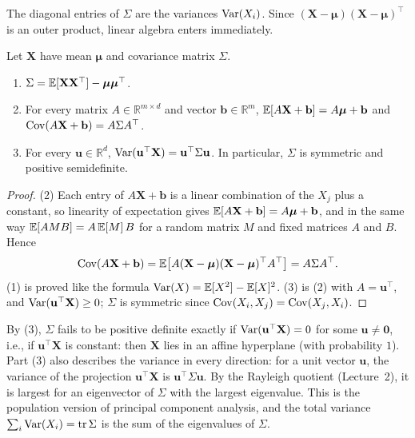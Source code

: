 The diagonal entries of $\Sigma$ are the variances $\operatorname{Var}(X_i)$. Since $(\mathbf{X} - \boldsymbol{\mu})(\mathbf{X} - \boldsymbol{\mu})^\top$ is an outer product, linear algebra enters immediately.

\begin{proposition}\label{L4-prop:covariance-matrix}
    Let $\mathbf{X}$ have mean $\boldsymbol{\mu}$ and covariance matrix $\Sigma$.
    \begin{enumerate}
        \item $\Sigma = \mathbb{E}[\mathbf{X}\mathbf{X}^\top] - \boldsymbol{\mu}\boldsymbol{\mu}^\top$.
        \item For every matrix $A \in \mathbb{R}^{m \times d}$ and vector $\mathbf{b} \in \mathbb{R}^m$, $\mathbb{E}[A\mathbf{X} + \mathbf{b}] = A\boldsymbol{\mu} + \mathbf{b}$ and $\operatorname{Cov}(A\mathbf{X} + \mathbf{b}) = A\Sigma A^\top$.
        \item For every $\mathbf{u} \in \mathbb{R}^d$, $\operatorname{Var}(\mathbf{u}^\top\mathbf{X}) = \mathbf{u}^\top\Sigma\mathbf{u}$. In particular, $\Sigma$ is symmetric and positive semidefinite.
    \end{enumerate}
\end{proposition}

\begin{proof}
    (2) Each entry of $A\mathbf{X} + \mathbf{b}$ is a linear combination of the $X_j$ plus a constant, so linearity of expectation gives $\mathbb{E}[A\mathbf{X} + \mathbf{b}] = A\boldsymbol{\mu} + \mathbf{b}$, and in the same way $\mathbb{E}[A M B] = A\,\mathbb{E}[M]\,B$ for a random matrix $M$ and fixed matrices $A$ and $B$. Hence
    \[\operatorname{Cov}(A\mathbf{X} + \mathbf{b}) = \mathbb{E}\big[A(\mathbf{X} - \boldsymbol{\mu})(\mathbf{X} - \boldsymbol{\mu})^\top A^\top\big] = A\Sigma A^\top.\]
    (1) is proved like the formula $\operatorname{Var}(X) = \mathbb{E}[X^2] - \mathbb{E}[X]^2$. (3) is (2) with $A = \mathbf{u}^\top$, and $\operatorname{Var}(\mathbf{u}^\top\mathbf{X}) \geq 0$; $\Sigma$ is symmetric since $\operatorname{Cov}(X_i, X_j) = \operatorname{Cov}(X_j, X_i)$.
\end{proof}

By (3), $\Sigma$ fails to be positive definite exactly if $\operatorname{Var}(\mathbf{u}^\top\mathbf{X}) = 0$ for some $\mathbf{u} \neq \mathbf{0}$, i.e., if $\mathbf{u}^\top\mathbf{X}$ is constant: then $\mathbf{X}$ lies in an affine hyperplane (with probability $1$). Part (3) also describes the variance in every direction: for a unit vector $\mathbf{u}$, the variance of the projection $\mathbf{u}^\top\mathbf{X}$ is $\mathbf{u}^\top\Sigma\mathbf{u}$. By the Rayleigh quotient (Lecture~2), it is largest for an eigenvector of $\Sigma$ with the largest eigenvalue. This is the population version of principal component analysis, and the total variance $\sum_i \operatorname{Var}(X_i) = \operatorname{tr}\Sigma$ is the sum of the eigenvalues of $\Sigma$.

